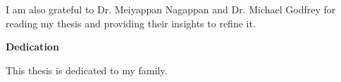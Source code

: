 I am also grateful to Dr. Meiyappan Nagappan and Dr. Michael Godfrey for reading my thesis and providing their insights to refine it. 

\cleardoublepage


\begin{center}\textbf{Dedication}\end{center}

This thesis is dedicated to my family.
\cleardoublepage

\renewcommand\contentsname{Table of Contents}
\tableofcontents
\cleardoublepage
{}    %

\listoftables
\cleardoublepage
{}		%

\listoffigures
\cleardoublepage
{}		%

\lstlistoflistings
\cleardoublepage
{}		%

\cleardoublepage
{}		%


